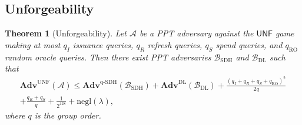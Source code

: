 \documentclass[11pt]{article}
\theoremstyle{definitionstyle}
\newtheorem{theorem}{Theorem}[section]
\theoremstyle{plain}
\newcommand{\advantage}[1]{\mathbf{Adv}^{\mathrm{#1}}}
\newcommand{\negl}{\mathrm{negl}}
\begin{document}
\subsection{Unforgeability}

\begin{theorem}[Unforgeability]
Let $\mathcal{A}$ be a PPT adversary against the $\mathsf{UNF}$ game making at most $q_I$ issuance queries, $q_R$ refresh queries, $q_S$ spend queries, and $q_{\text{RO}}$ random oracle queries. Then there exist PPT adversaries $\mathcal{B}_{\text{SDH}}$ and $\mathcal{B}_{\text{DL}}$ such that
\begin{align*}
\advantage{UNF}(\mathcal{A}) \le \advantage{q\text{-}SDH}(\mathcal{B}_{\text{SDH}}) + \advantage{DL}(\mathcal{B}_{\text{DL}}) + \frac{(q_I+q_R+q_S+q_{\text{RO}})^2}{2q} \\
+ \frac{q_R+q_S}{q} + \frac{1}{2^{128}} + \negl(\lambda),
\end{align*}
where $q$ is the group order.
\end{theorem}
\end{document}
